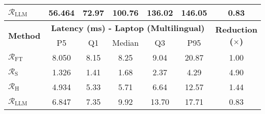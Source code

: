 \begin{table}[t]
\begin{tabular}{lcccccc}
$\mathcal{R}_\text{LLM}$ & 56.464 & 72.97 & 100.76 & 136.02 & 146.05 & 0.83 \\ %
\midrule
\multirow{2}{*}{\textbf{Method}} 
& \multicolumn{5}{c}{\textbf{Latency (ms) - Laptop (Multilingual)}} & \multirow{2}{*}{\textbf{Reduction ($\times$)}} \\
\cmidrule(lr){2-6}
& P5 & Q1 & Median & Q3 & P95 & \\
\midrule
$\mathcal{R}_\text{FT}$ & 8.050 & 8.15 & 8.25 & 9.04 & 20.87 & 1.00 \\ %
$\mathcal{R}_\text{S}$ & 1.326 & 1.41 & 1.68 & 2.37 & 4.29 & 4.90 \\ %
$\mathcal{R}_\text{H}$ & 4.934 & 5.33 & 5.71 & 6.64 & 12.57 & 1.44 \\ %
$\mathcal{R}_\text{LLM}$ & 6.847 & 7.35 & 9.92 & 13.70 & 17.71 & 0.83 \\ %
\bottomrule
\end{tabular}
\vspace{-2mm} %
\end{table}
